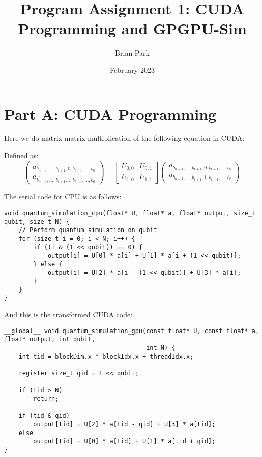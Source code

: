 \documentclass{article}
\title{Program Assignment 1: CUDA Programming and GPGPU-Sim}
\author{Brian Park}
\affil{North Carolina State University, Computer Engineering 786}
\date{February 2023}
\begin{document}
\maketitle

\section{Part A: CUDA Programming}

Here we do matrix matrix multiplication of the following equation in CUDA:

Defined as:
$$\left(\begin{array}{l}
a_{b_{n-1}, \ldots, b_{t+1}, 0, b_{t-1}, \ldots, b_0}^{\prime} \\
a_{b_{n-1}^{\prime}, \ldots, b_{t+1}, 1, b_{t-1}, \ldots, b_0}
\end{array}\right)=\left[\begin{array}{ll}
U_{0,0} & U_{0,1} \\
U_{1,0} & U_{1,1}
\end{array}\right]\left(\begin{array}{l}
a_{b_{n-1}, \ldots, b_{t+1}, 0, b_{t-1}, \ldots, b_0} \\
a_{b_{n-1}, \ldots, b_{t+1}, 1, b_{t-1}, \ldots, b_0}
\end{array}\right)$$

The serial code for CPU is as follows:
\begin{verbatim}
void quantum_simulation_cpu(float* U, float* a, float* output, size_t qubit, size_t N) {
    // Perform quantum simulation on qubit
    for (size_t i = 0; i < N; i++) {
        if ((i & (1 << qubit)) == 0) {
            output[i] = U[0] * a[i] + U[1] * a[i + (1 << qubit)];
        } else {
            output[i] = U[2] * a[i - (1 << qubit)] + U[3] * a[i];
        }
    }
}    
\end{verbatim}

And this is the transformed CUDA code:
\begin{verbatim}
__global__ void quantum_simulation_gpu(const float* U, const float* a, float* output, int qubit,
                                       int N) {
    int tid = blockDim.x * blockIdx.x + threadIdx.x;

    register size_t qid = 1 << qubit;

    if (tid > N)
        return;

    if (tid & qid)
        output[tid] = U[2] * a[tid - qid] + U[3] * a[tid];
    else
        output[tid] = U[0] * a[tid] + U[1] * a[tid + qid];
}
\end{verbatim}
\end{document}
